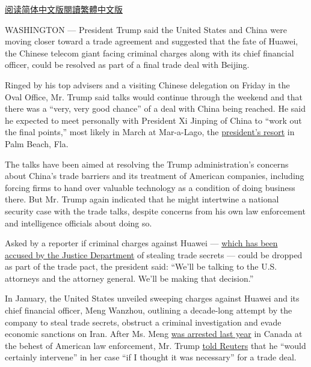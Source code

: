 \href{https://cn.nytimes.com/business/20190225/china-usa-trade/}{阅读简体中文版}\href{https://cn.nytimes.com/business/20190225/china-usa-trade/zh-hant/}{閱讀繁體中文版}

WASHINGTON --- President Trump said the United States and China were
moving closer toward a trade agreement and suggested that the fate of
Huawei, the Chinese telecom giant facing criminal charges along with its
chief financial officer, could be resolved as part of a final trade deal
with Beijing.

Ringed by his top advisers and a visiting Chinese delegation on Friday
in the Oval Office, Mr. Trump said talks would continue through the
weekend and that there was a ``very, very good chance'' of a deal with
China being reached. He said he expected to meet personally with
President Xi Jinping of China to ``work out the final points,'' most
likely in March at Mar-a-Lago, the
\href{https://www.nytimes.com/2017/02/18/us/mar-a-lago-trump-ethics-winter-white-house.html}{president's
resort} in Palm Beach, Fla.

The talks have been aimed at resolving the Trump administration's
concerns about China's trade barriers and its treatment of American
companies, including forcing firms to hand over valuable technology as a
condition of doing business there. But Mr. Trump again indicated that he
might intertwine a national security case with the trade talks, despite
concerns from his own law enforcement and intelligence officials about
doing so.

Asked by a reporter if criminal charges against Huawei ---
\href{https://www.nytimes.com/2019/01/28/us/politics/meng-wanzhou-huawei-iran.html}{which
has been accused by the Justice Department} of stealing trade secrets
--- could be dropped as part of the trade pact, the president said:
``We'll be talking to the U.S. attorneys and the attorney general. We'll
be making that decision.''

In January, the United States unveiled sweeping charges against Huawei
and its chief financial officer, Meng Wanzhou, outlining a decade-long
attempt by the company to steal trade secrets, obstruct a criminal
investigation and evade economic sanctions on Iran. After Ms. Meng
\href{https://www.nytimes.com/2018/12/05/business/huawei-cfo-arrest-canada-extradition.html}{was
arrested last year} in Canada at the behest of American law enforcement,
Mr. Trump
\href{https://www.reuters.com/article/us-usa-trump-huawei-tech-exclusive/exclusive-trump-says-he-could-intervene-in-u-s-case-against-huawei-cfo-idUSKBN1OA2PQ}{told
Reuters} that he ``would certainly intervene'' in her case ``if I
thought it was necessary'' for a trade deal.

